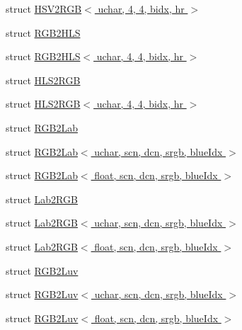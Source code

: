 \begin{DoxyCompactItemize}
\item 
struct \hyperlink{structcv_1_1gpu_1_1device_1_1color__detail_1_1HSV2RGB_3_01uchar_00_014_00_014_00_01bidx_00_01hr_01_4}{H\-S\-V2\-R\-G\-B$<$ uchar, 4, 4, bidx, hr $>$}
\item 
struct \hyperlink{structcv_1_1gpu_1_1device_1_1color__detail_1_1RGB2HLS}{R\-G\-B2\-H\-L\-S}
\item 
struct \hyperlink{structcv_1_1gpu_1_1device_1_1color__detail_1_1RGB2HLS_3_01uchar_00_014_00_014_00_01bidx_00_01hr_01_4}{R\-G\-B2\-H\-L\-S$<$ uchar, 4, 4, bidx, hr $>$}
\item 
struct \hyperlink{structcv_1_1gpu_1_1device_1_1color__detail_1_1HLS2RGB}{H\-L\-S2\-R\-G\-B}
\item 
struct \hyperlink{structcv_1_1gpu_1_1device_1_1color__detail_1_1HLS2RGB_3_01uchar_00_014_00_014_00_01bidx_00_01hr_01_4}{H\-L\-S2\-R\-G\-B$<$ uchar, 4, 4, bidx, hr $>$}
\item 
struct \hyperlink{structcv_1_1gpu_1_1device_1_1color__detail_1_1RGB2Lab}{R\-G\-B2\-Lab}
\item 
struct \hyperlink{structcv_1_1gpu_1_1device_1_1color__detail_1_1RGB2Lab_3_01uchar_00_01scn_00_01dcn_00_01srgb_00_01blueIdx_01_4}{R\-G\-B2\-Lab$<$ uchar, scn, dcn, srgb, blue\-Idx $>$}
\item 
struct \hyperlink{structcv_1_1gpu_1_1device_1_1color__detail_1_1RGB2Lab_3_01float_00_01scn_00_01dcn_00_01srgb_00_01blueIdx_01_4}{R\-G\-B2\-Lab$<$ float, scn, dcn, srgb, blue\-Idx $>$}
\item 
struct \hyperlink{structcv_1_1gpu_1_1device_1_1color__detail_1_1Lab2RGB}{Lab2\-R\-G\-B}
\item 
struct \hyperlink{structcv_1_1gpu_1_1device_1_1color__detail_1_1Lab2RGB_3_01uchar_00_01scn_00_01dcn_00_01srgb_00_01blueIdx_01_4}{Lab2\-R\-G\-B$<$ uchar, scn, dcn, srgb, blue\-Idx $>$}
\item 
struct \hyperlink{structcv_1_1gpu_1_1device_1_1color__detail_1_1Lab2RGB_3_01float_00_01scn_00_01dcn_00_01srgb_00_01blueIdx_01_4}{Lab2\-R\-G\-B$<$ float, scn, dcn, srgb, blue\-Idx $>$}
\item 
struct \hyperlink{structcv_1_1gpu_1_1device_1_1color__detail_1_1RGB2Luv}{R\-G\-B2\-Luv}
\item 
struct \hyperlink{structcv_1_1gpu_1_1device_1_1color__detail_1_1RGB2Luv_3_01uchar_00_01scn_00_01dcn_00_01srgb_00_01blueIdx_01_4}{R\-G\-B2\-Luv$<$ uchar, scn, dcn, srgb, blue\-Idx $>$}
\item 
struct \hyperlink{structcv_1_1gpu_1_1device_1_1color__detail_1_1RGB2Luv_3_01float_00_01scn_00_01dcn_00_01srgb_00_01blueIdx_01_4}{R\-G\-B2\-Luv$<$ float, scn, dcn, srgb, blue\-Idx $>$}

\end{DoxyCompactItemize}
